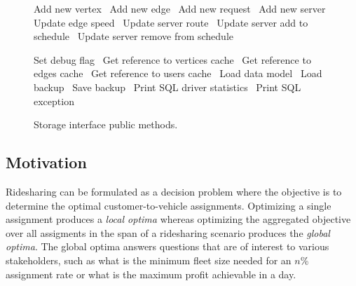 \documentclass{article}
\newcommand{\hi}[1]{\noindent {\bf #1}}     %
\def\nwendcode{\endtrivlist \endgroup}      %
\let\nwdocspar=\par
\theoremstyle{definition}                   %
\begin{document}
\begin{figure}
{\begin{minipage}[t]{0.5\textwidth}
\nwendcode{}\nwdocspar
\end{minipage}
\begin{minipage}[t]{0.5\textwidth}
\hi{Write Methods}
\nwenddocs{}\plusendmoddef
\LA{}Add new vertex~{\nwtagstyle{}}\RA{}
\LA{}Add new edge~{\nwtagstyle{}}\RA{}
\LA{}Add new request~{\nwtagstyle{}}\RA{}
\LA{}Add new server~{\nwtagstyle{}}\RA{}
\LA{}Update edge speed~{\nwtagstyle{}}\RA{}
\LA{}Update server route~{\nwtagstyle{}}\RA{}
\LA{}Update server add to schedule~{\nwtagstyle{}}\RA{}
\LA{}Update server remove from schedule~{\nwtagstyle{}}\RA{}
\nwendcode{}\nwdocspar
\hi{Utilities}
\nwenddocs{}\plusendmoddef
\LA{}Set debug flag~{\nwtagstyle{}}\RA{}
\LA{}Get reference to vertices cache~{\nwtagstyle{}}\RA{}
\LA{}Get reference to edges cache~{\nwtagstyle{}}\RA{}
\LA{}Get reference to users cache~{\nwtagstyle{}}\RA{}
\LA{}Load data model~{\nwtagstyle{}}\RA{}
\LA{}Load backup~{\nwtagstyle{}}\RA{}
\LA{}Save backup~{\nwtagstyle{}}\RA{}
\LA{}Print SQL driver statistics~{\nwtagstyle{}}\RA{}
\LA{}Print SQL exception~{\nwtagstyle{}}\RA{}
\nwendcode{}\nwdocspar
\end{minipage}
}
\caption{Storage interface public methods.}
\label{fig:methods}
\end{figure}

\subsection{Motivation}
\label{sec:motivation}
Ridesharing can be formulated as a decision problem where the objective is to
determine the optimal customer-to-vehicle assignments. Optimizing a single
assignment produces a \emph{local optima} whereas optimizing the aggregated
objective over all assigments in the span of a ridesharing scenario produces
the \emph{global optima}. The global optima answers questions that are of
interest to various stakeholders, such as what is the minimum fleet size needed
for an $n$\% assignment rate or what is the maximum profit achievable in a day.
\end{document}
